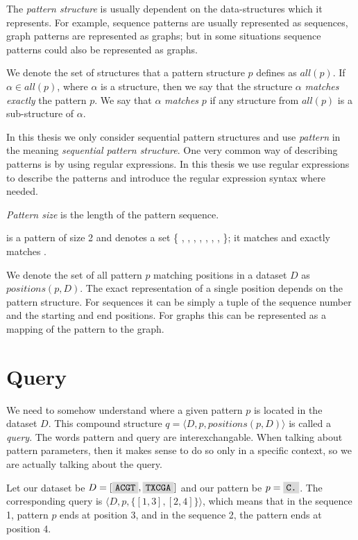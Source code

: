 The \emph{pattern structure} is usually dependent on the data-structures which it represents. For example, sequence patterns are usually represented as sequences, graph patterns are represented as graphs; but in some situations sequence patterns could also be represented as graphs.

We denote the set of structures that a pattern structure $p$ defines as $all(p)$. If $\alpha \in all(p)$, where $\alpha$ is a structure, then we say that the structure $\alpha$ \emph{matches exactly} the pattern $p$. We say that $\alpha$ \emph{matches} $p$ if any structure from $all(p)$ is a sub-structure of $\alpha$.

In this thesis we only consider sequential pattern structures and use \emph{pattern} in the meaning \emph{sequential pattern structure}. One very common way of describing patterns is by using regular expressions\cite{KleeneRegularSets,RegularExpressions}. In this thesis we use regular expressions to describe the patterns and introduce the regular expression syntax where needed.

\emph{Pattern size} is the length of the pattern sequence.

\begin{exmp}
 is a pattern of size 2 and denotes a set 
\{ , , , , , , , \}; it matches  and exactly matches .	
\end{exmp}

We denote the set of all pattern $p$ matching positions in a dataset $D$ as $positions(p, D)$. The exact representation of a single position depends on the pattern structure. For sequences it can be simply a tuple of the sequence number and the starting and end positions. For graphs this can be represented as a mapping of the pattern to the graph.

\section{Query}

We need to somehow understand where a given pattern $p$ is located in the dataset $D$. This compound structure $q = \langle D, p, positions(p, D) \rangle $ is called a \emph{query}. The words pattern and query are interexchangable. When talking about pattern parameters, then it makes sense to do so only in a specific context, so we are actually talking about the query.

\begin{exmp}
Let our dataset be $D = [ \text{\R{ACGT}}, \text{\R{TXCGA}} ]$ and our pattern be $p = \text{\R{C.}}$. The corresponding query is $\langle D, p, \{ [1,3], [2,4]\} \rangle$, which means that in the sequence 1, pattern $p$ ends at position 3, and in the sequence 2, the pattern ends at position 4.
\end{exmp} 

